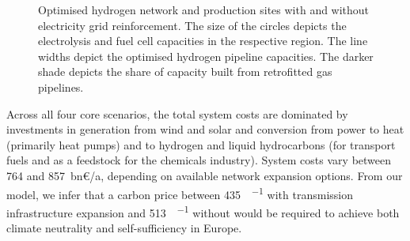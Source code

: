 
\begin{figure}
    \centering
     \caption{Optimised hydrogen network and production sites with and without
    electricity grid reinforcement. The size of the circles depicts the
    electrolysis and fuel cell capacities in the respective region. The line
    widths depict the optimised hydrogen pipeline capacities. The darker shade
    depicts the share of capacity built from retrofitted gas pipelines.}
    \label{fig:h2-network}
\end{figure}



Across all four core scenarios, the total system costs are dominated by
investments in generation from wind and solar and conversion from power to heat
(primarily heat pumps) and to hydrogen and liquid hydrocarbons (for transport
fuels and as a feedstock for the chemicals industry). System costs vary between
764 and 857~bn\euro/a, depending on available network expansion options. From
our model, we infer that a carbon price between \SI{435}{\sieuro\per\tco} with
transmission infrastructure expansion and \SI{513}{\sieuro\per\tco} without
would be required to achieve both climate neutrality and self-sufficiency in Europe.


